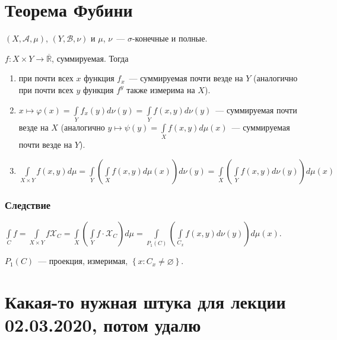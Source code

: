 \documentclass{article}
\begin{document}
    \newpage
    
    \section{Теорема Фубини}
    
        $(X, \mathcal{A}, \mu)$, $(Y, \mathcal{B}, \nu)$ и $\mu$, $\nu$~--- $\sigma$-конечные и полные.
        
        $f : X \times Y \rightarrow \overline{\mathbb{R}}$, суммируемая. Тогда
        
        \begin{enumerate}
        
            \item при почти всех $x$ функция $f_x$~--- суммируемая почти везде на $Y$ (аналогично при почти всех $y$ функция $f^y$ также измерима на $X$).
            
            \item $x \mapsto \varphi(x) = \int\limits_Y f_x(y) d \nu (y) = \int\limits_Y f(x, y) d \nu (y)$~--- суммируемая почти везде на $X$ (аналогично $y \mapsto \psi(y) = \int\limits_X f(x, y) d \mu(x)$~--- суммируемая почти везде на $Y$).
            
            \item $\int\limits_{X \times Y} f(x, y) d \mu = \int\limits_{Y} \left( \int\limits_{X} f (x, y) d \mu (x) \right) d \nu (y) = \int\limits_X \left( \int\limits_Y f(x, y) d \nu (y) \right) d \mu (x)$
            
        \end{enumerate}
    
        \subsubsection{Следствие}
        
            $\int\limits_C f = \int\limits_{X \times Y} f \mathcal{X}_C = \int\limits_X \left( \int\limits_Y f \cdot \mathcal{X}_C \right) d \mu = \int\limits_{P_1(C)} \left( \int\limits_{C_x} f(x, y) d \nu(y) \right) d \mu (x)$.
            
            $P_1(C)$~--- проекция, измеримая, $\left\{ x : C_x \neq \varnothing \right\}$.
    
    \newpage
    
    \section{Какая-то нужная штука для лекции 02.03.2020, потом удалю}
    
\end{document}
